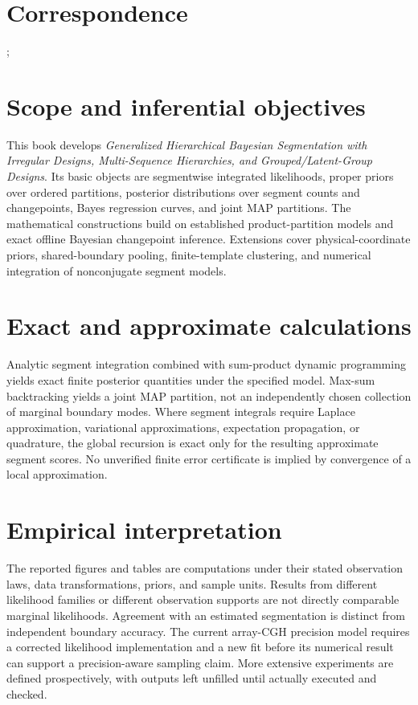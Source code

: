 \section*{Correspondence}
\href{mailto:\ProjectCorrespondence}{\texttt{\ProjectCorrespondence}};\enspace
\href{mailto:\ProjectCorrespondenceTwo}{\texttt{\ProjectCorrespondenceTwo}}

\section*{Scope and inferential objectives}
This book develops \emph{Generalized Hierarchical Bayesian Segmentation with Irregular Designs,
Multi-Sequence Hierarchies, and Grouped/Latent-Group Designs}. Its basic objects are segmentwise
integrated likelihoods, proper priors over ordered partitions, posterior distributions over segment
counts and changepoints, Bayes regression curves, and joint MAP partitions. The mathematical
constructions build on established product-partition models and exact offline Bayesian changepoint
inference. Extensions cover physical-coordinate priors, shared-boundary pooling, finite-template
clustering, and numerical integration of nonconjugate segment models.

\section*{Exact and approximate calculations}
Analytic segment integration combined with sum-product dynamic programming yields exact finite
posterior quantities under the specified model. Max-sum backtracking yields a joint MAP partition,
not an independently chosen collection of marginal boundary modes. Where segment integrals require
Laplace approximation, variational approximations, expectation propagation, or quadrature, the
global recursion is exact only for the resulting approximate segment scores. No unverified finite
error certificate is implied by convergence of a local approximation.

\section*{Empirical interpretation}
The reported figures and tables are computations under their stated observation laws, data
transformations, priors, and sample units. Results from different likelihood families or different
observation supports are not directly comparable marginal likelihoods. Agreement with an estimated
segmentation is distinct from independent boundary accuracy. The current array-CGH precision model
requires a corrected likelihood implementation and a new fit before its numerical result can
support a precision-aware sampling claim. More extensive experiments are defined prospectively,
with outputs left unfilled until actually executed and checked.

